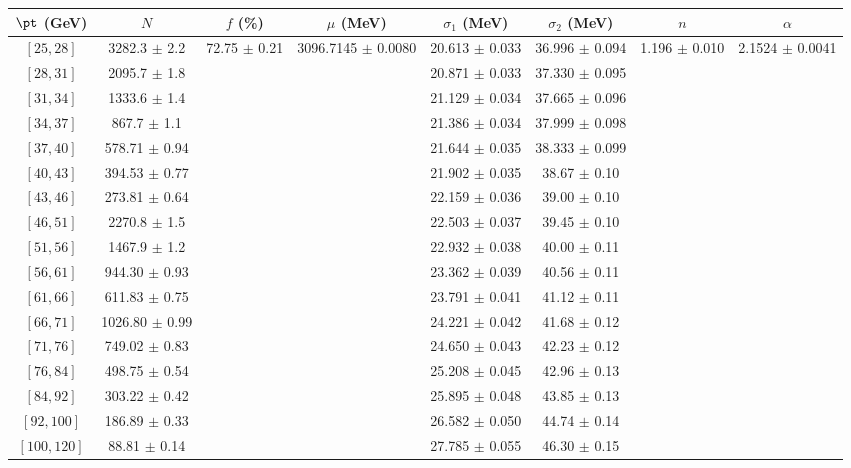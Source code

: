 \begin{tabular}{c||c|c|c|c|c|c|c}
$\pt$ (GeV) & $N$ & $f$ (\%) & $\mu$ (MeV) & $\sigma_1$ (MeV) & $\sigma_2$ (MeV) & $n$ & $\alpha$ \\
\hline
$[25, 28]$ & 3282.3 $\pm$ 2.2 & \multirow{17}{*}{72.75 $\pm$ 0.21} & \multirow{17}{*}{3096.7145 $\pm$ 0.0080} & 20.613 $\pm$ 0.033 & 36.996 $\pm$ 0.094 & \multirow{17}{*}{1.196 $\pm$ 0.010} & \multirow{17}{*}{2.1524 $\pm$ 0.0041}\\
$[28, 31]$ & 2095.7 $\pm$ 1.8 &  &  & 20.871 $\pm$ 0.033 & 37.330 $\pm$ 0.095 &  & \\
$[31, 34]$ & 1333.6 $\pm$ 1.4 &  &  & 21.129 $\pm$ 0.034 & 37.665 $\pm$ 0.096 &  & \\
$[34, 37]$ & 867.7 $\pm$ 1.1 &  &  & 21.386 $\pm$ 0.034 & 37.999 $\pm$ 0.098 &  & \\
$[37, 40]$ & 578.71 $\pm$ 0.94 &  &  & 21.644 $\pm$ 0.035 & 38.333 $\pm$ 0.099 &  & \\
$[40, 43]$ & 394.53 $\pm$ 0.77 &  &  & 21.902 $\pm$ 0.035 & 38.67 $\pm$ 0.10 &  & \\
$[43, 46]$ & 273.81 $\pm$ 0.64 &  &  & 22.159 $\pm$ 0.036 & 39.00 $\pm$ 0.10 &  & \\
$[46, 51]$ & 2270.8 $\pm$ 1.5 &  &  & 22.503 $\pm$ 0.037 & 39.45 $\pm$ 0.10 &  & \\
$[51, 56]$ & 1467.9 $\pm$ 1.2 &  &  & 22.932 $\pm$ 0.038 & 40.00 $\pm$ 0.11 &  & \\
$[56, 61]$ & 944.30 $\pm$ 0.93 &  &  & 23.362 $\pm$ 0.039 & 40.56 $\pm$ 0.11 &  & \\
$[61, 66]$ & 611.83 $\pm$ 0.75 &  &  & 23.791 $\pm$ 0.041 & 41.12 $\pm$ 0.11 &  & \\
$[66, 71]$ & 1026.80 $\pm$ 0.99 &  &  & 24.221 $\pm$ 0.042 & 41.68 $\pm$ 0.12 &  & \\
$[71, 76]$ & 749.02 $\pm$ 0.83 &  &  & 24.650 $\pm$ 0.043 & 42.23 $\pm$ 0.12 &  & \\
$[76, 84]$ & 498.75 $\pm$ 0.54 &  &  & 25.208 $\pm$ 0.045 & 42.96 $\pm$ 0.13 &  & \\
$[84, 92]$ & 303.22 $\pm$ 0.42 &  &  & 25.895 $\pm$ 0.048 & 43.85 $\pm$ 0.13 &  & \\
$[92, 100]$ & 186.89 $\pm$ 0.33 &  &  & 26.582 $\pm$ 0.050 & 44.74 $\pm$ 0.14 &  & \\
$[100, 120]$ & 88.81 $\pm$ 0.14 &  &  & 27.785 $\pm$ 0.055 & 46.30 $\pm$ 0.15 &  & \\
\end{tabular}
